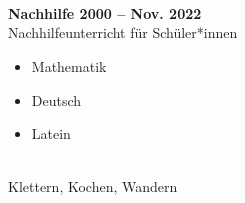 \begin{smashminipageleft}
	\begin{center}
		\mypic
		\mycontact
		\smallbreak
		\textbf{}\\
		\smallbreak
		\\
		\bigbreak
		\textbf{} \\
		\smallbreak
		\\
	\end{center}
	\vfill
\end{smashminipageleft}
%
\hfill
\begin{smashminipageright}
	\\
	\color{medium-gray}
	\normalsize \MakeUppercase{\so{\cv}} \\
	\\
	\bigbreak
	\\
	\textbf{Nachhilfe \hfill 2000 – Nov. 2022 }\\
	Nachhilfeunterricht für Schüler*innen
	\begin{itemize}
		\itemsep0em %
		\item Mathematik
		\item Deutsch
		\item Latein
	\end{itemize}
	
	\bigbreak
	\bigbreak
	\\
	Klettern, Kochen, Wandern
\end{smashminipageright}